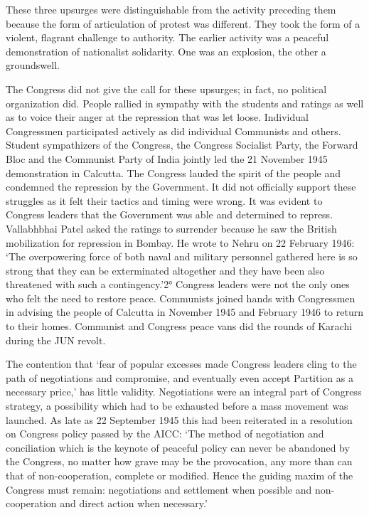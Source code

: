 These three upsurges were distinguishable from the activity preceding them because the form of articulation of protest was different. They took the form of a violent, flagrant challenge to authority. The earlier activity was a peaceful demonstration of nationalist solidarity. One was an explosion, the other a groundswell. 

The Congress did not give the call for these upsurges; in fact, no political organization did. People rallied in sympathy with the students and ratings as well as to voice their anger at the repression that was let loose. Individual Congressmen participated actively as did individual Communists and others. Student sympathizers of the Congress, the Congress Socialist Party, the Forward Bloc and the Communist Party of India jointly led the 21 November 1945 demonstration in Calcutta. The Congress lauded the spirit of the people and condemned the repression by the Government. It did not officially support these struggles as it felt their tactics and timing were wrong. It was evident to Congress leaders that the Government was able and determined to repress. Vallabhbhai Patel asked the ratings to surrender because he saw the British mobilization for repression in Bombay. He wrote to Nehru on 22 February 1946: ‘The overpowering force of both naval and military personnel gathered here is so strong that they can be exterminated altogether and they have been also threatened with such a contingency.’2° Congress leaders were not the only ones who felt the need to restore peace. Communists joined hands with Congressmen in advising the people of Calcutta in November 1945 and February 1946 to return to their homes. Communist and Congress peace vans did the rounds of Karachi during the JUN revolt. 

The contention that ‘fear of popular excesses made Congress leaders cling to the path of negotiations and compromise, and eventually even accept Partition as a necessary price,’ has little validity. Negotiations were an integral part of Congress strategy, a possibility which had to be exhausted before a mass movement was launched. As late as 22 September 1945 this had been reiterated in a resolution on Congress policy passed by the AICC: ‘The method of negotiation and conciliation which is the keynote of peaceful policy can never be abandoned by the Congress, no matter how grave may be the provocation, any more than can that of non-cooperation, complete or modified. Hence the guiding maxim of the Congress must remain: negotiations and settlement when possible and non-cooperation and direct action when necessary.’ 

